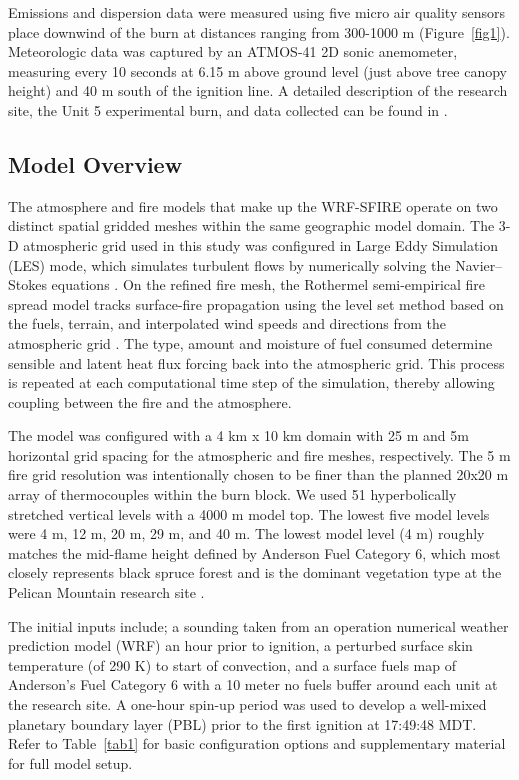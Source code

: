 \documentclass[preprints,article,accept,moreauthors,pdftex]{Definitions/mdpi}
\begin{document}
Emissions and dispersion data were measured using five micro air quality sensors place downwind of the burn at distances ranging from 300-1000 m (Figure~\ref{fig1}). Meteorologic data was captured by an ATMOS-41 2D sonic anemometer, measuring every 10 seconds at 6.15 m above ground level (just above tree canopy height) and 40 m south of the ignition line. A detailed description of the research site, the Unit 5 experimental burn, and data collected can be found in \cite{thompson_recent_2020,thompson_data_2020,huda_study_2020}.

\subsection{Model Overview}

The atmosphere and fire models that make up the WRF-SFIRE operate on two distinct spatial gridded meshes within the same geographic model domain. The 3-D atmospheric grid used in this study was configured in Large Eddy Simulation (LES) mode, which simulates turbulent flows by numerically solving the Navier–Stokes equations \cite{mandel_coupled_2011,mandel_recent_2014}. On the refined fire mesh, the Rothermel semi-empirical fire spread model tracks surface-fire propagation using the level set method based on the fuels, terrain, and interpolated wind speeds and directions from the atmospheric grid \cite{mandel_coupled_2011,mandel_recent_2014,munozesparza_accurate_2018}. The type, amount and moisture of fuel consumed determine sensible and latent heat flux forcing back into the atmospheric grid. This process is repeated at each computational time step of the simulation, thereby allowing coupling between the fire and the atmosphere.

The model was configured with a 4 km x 10 km domain with 25 m and 5m horizontal grid spacing for the atmospheric and fire meshes, respectively. The 5 m fire grid resolution was intentionally chosen to be finer than the planned 20x20 m array of thermocouples within the burn block. We used 51 hyperbolically stretched vertical levels with a 4000 m model top. The lowest five model levels were 4 m, 12 m, 20 m, 29 m, and 40 m. The lowest model level (4 m) roughly matches the mid-flame height defined by Anderson Fuel Category 6, which most closely represents black spruce forest and is the dominant vegetation type at the Pelican Mountain research site \cite{anderson_aids_1982}.

The initial inputs include; a sounding taken from an operation numerical weather prediction model (WRF) an hour prior to ignition, a perturbed surface skin temperature (of 290 K) to start of convection, and a surface fuels map of Anderson’s Fuel Category 6 with a 10 meter no fuels buffer around each unit at the research site. A one-hour spin-up period was used to develop a well-mixed planetary boundary layer (PBL) prior to the first ignition at 17:49:48 MDT. Refer to Table~\ref{tab1} for basic configuration options and supplementary material for full model setup.
\end{document}
